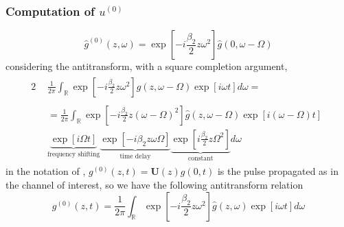 \documentclass[8pt]{beamer} %
\begin{document}
\begin{frame}
    \frametitle{Computation of $u^{(0)}$}
    \begin{equation}
        \hat{g}^{(0)}(z, \omega) =  \exp \left[- i \frac{\beta_{2}}{2} z \omega^2 \right] \hat{g}(0, \omega - \Omega)
    \end{equation}
    considering the antitransform, with a square completion argument,
    \begin{alignat}{2}
         & \begin{aligned}
               \frac{1}{2\pi} \int_{\mathbb{R}} \exp \left[-i\frac{\beta_2}{2}z \omega^2 \right] \hat{g}(z, \omega - \Omega) \exp \left[i\omega t\right] d\omega =
           \end{aligned}\label{eq:nlA_2}                                               \\
         & \begin{aligned}
               =\frac{1}{2\pi} \int_{\mathbb{R}} \exp \left[-i\frac{\beta_2}{2}z (\omega-\Omega)^2 \right]  \hat{g}(z, \omega - \Omega) \exp \left[i(\omega -\Omega) t\right] \\
               \underbrace{\exp \left[i\Omega t\right]}_{\text{frequency shifting}} \underbrace{\exp \left[- i \beta_2 z \omega \Omega\right]}_{\text{time delay}} \underbrace{\exp\left[i\frac{\beta_2}{2}z \Omega^2 \right]}_{\text{constant}} d\omega
           \end{aligned}\label{eq:nlB_2}
    \end{alignat}
    in the notation of \cite{Dar_2013}, $g^{(0)}(z, t) = \mathbf{U}(z)g(0, t)$ is the pulse propagated as in the channel of interest, so we have the following antitransform relation
    \begin{equation}
        g^{(0)}(z, t) = \frac{1}{2\pi}\int_{\mathbb{R}} \exp \left[-i\frac{\beta_2}{2}z \omega^2 \right]  \hat{g}(z, \omega) \exp\left[i\omega t\right]d\omega
    \end{equation}
\end{frame}
\end{document}
